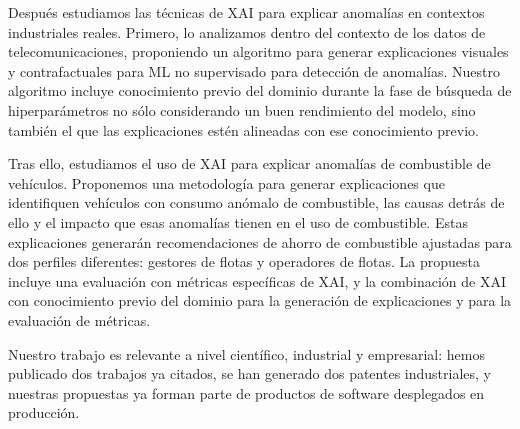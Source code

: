 Después estudiamos las técnicas de XAI para explicar anomalías en contextos industriales reales. Primero, lo analizamos dentro del contexto de los datos de telecomunicaciones, proponiendo un algoritmo para generar explicaciones visuales y contrafactuales para ML no supervisado para detección de anomalías. Nuestro algoritmo incluye conocimiento previo del dominio durante la fase de búsqueda de hiperparámetros no sólo considerando un buen rendimiento del modelo, sino también el que las explicaciones estén alineadas con ese conocimiento previo.

Tras ello, estudiamos el uso de XAI para explicar anomalías de combustible de vehículos. Proponemos una metodología para generar explicaciones que identifiquen vehículos con consumo anómalo de combustible, las causas detrás de ello y el impacto que esas anomalías tienen en el uso de combustible. Estas explicaciones generarán recomendaciones de ahorro de combustible ajustadas para dos perfiles diferentes: gestores de flotas y operadores de flotas. La propuesta incluye una evaluación con métricas específicas de XAI, y la combinación de XAI con conocimiento previo del dominio para la generación de explicaciones y para la evaluación de métricas.

Nuestro trabajo es relevante a nivel científico, industrial y empresarial: hemos publicado dos
trabajos ya citados, se han generado dos patentes industriales, y nuestras propuestas ya forman parte de productos de software desplegados en producción.

{}

\newpage